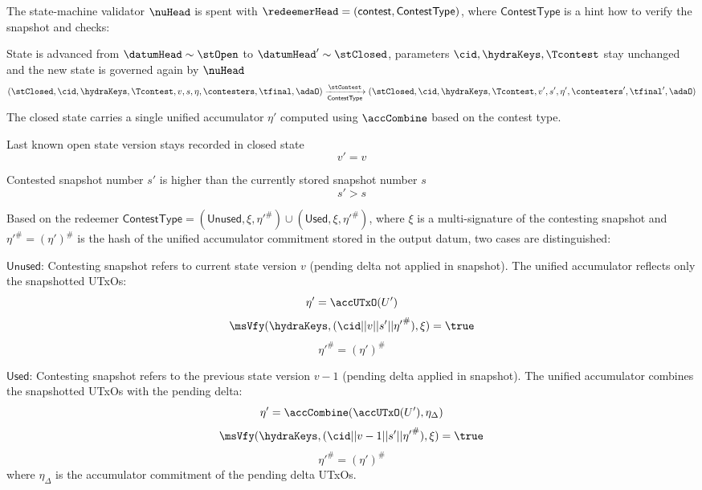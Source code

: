 \noindent The state-machine validator $\nuHead$ is spent with
$\redeemerHead = (\mathsf{contest}, \mathsf{ContestType})$, where
$\mathsf{ContestType}$ is a hint how to verify the snapshot and checks:
\begin{menumerate}
	\item State is advanced from $\datumHead \sim \stOpen$ to
	$\datumHead' \sim \stClosed$, parameters $\cid,\hydraKeys,\Tcontest$
	stay unchanged and the new state is governed again by $\nuHead$
	\[
		(\stClosed,\cid,\hydraKeys,\Tcontest,v,s,\eta,\contesters,\tfinal,\adaO) \xrightarrow[\mathsf{ContestType}]{\stContest} (\stClosed,\cid,\hydraKeys,\Tcontest,v',s',\eta',\contesters',\tfinal',\adaO)
	\]
	The closed state carries a single unified accumulator $\eta'$ computed using $\accCombine$ based on the contest type.

	\item Last known open state version stays recorded in closed state
	\[
		v' = v
	\]

	\item Contested snapshot number $s'$ is higher than the currently stored snapshot number $s$
	\[
		s' > s
	\]
	\item Based on the redeemer $\mathsf{ContestType} = (\mathsf{Unused}, \xi, {\eta'}^{\#}) \cup (\mathsf{Used}, \xi, {\eta'}^{\#})$, where $\xi$ is a multi-signature of the contesting snapshot and ${\eta'}^{\#} = (\eta')^{\#}$ is the hash of the unified accumulator commitment stored in the output datum, two cases are distinguished:

	\begin{menumerate}
		\item $\mathsf{Unused}$: Contesting snapshot refers to current state version $v$ (pending delta not applied in snapshot). The unified accumulator reflects only the snapshotted UTxOs:
		\[
			\eta' = \accUTxO(U')
		\]
		\[
			\msVfy(\hydraKeys,(\cid || v || s' || {\eta'}^{\#}),\xi) = \true
		\]
		\[
			{\eta'}^{\#} = (\eta')^{\#}
		\]
		\item $\mathsf{Used}$: Contesting snapshot refers to the previous state version $v - 1$ (pending delta applied in snapshot). The unified accumulator combines the snapshotted UTxOs with the pending delta:
		\[
			\eta' = \accCombine(\accUTxO(U'), \eta_\Delta)
		\]
		\[
			\msVfy(\hydraKeys,(\cid || v - 1 || s' || {\eta'}^{\#}),\xi) = \true
		\]
		\[
			{\eta'}^{\#} = (\eta')^{\#}
		\]
		where $\eta_\Delta$ is the accumulator commitment of the pending delta UTxOs.
	\end{menumerate}


\end{menumerate}
